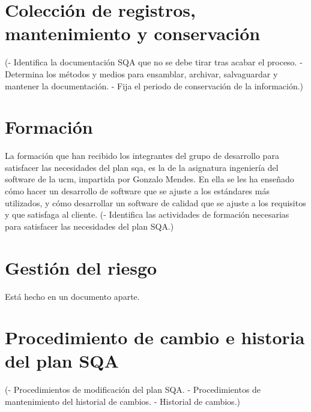 \documentclass[spanish,a4paper,11pt, twoside]{report}	%
\begin{document}
\chapter{ Colección de registros, mantenimiento y conservación}
	(- Identifica la documentación SQA que no se debe
	tirar tras acabar el proceso.
	- Determina los métodos y medios para ensamblar,
	archivar, salvaguardar y mantener la documentación.
	- Fija el periodo de conservación de la información.)

\newpage
\mbox{}
\thispagestyle{empty}						%
\newpage

\chapter{ \hspace{0.25cm}Formación}
	La formación que han recibido los integrantes del grupo de desarrollo para satisfacer las necesidades del plan sqa, es la de la asignatura ingeniería del software de la ucm, impartida por Gonzalo Mendes. En ella se les ha enseñado 
	cómo hacer un desarrollo de software que se ajuste a los estándares más utilizados,  y cómo desarrollar un software de calidad que se ajuste a los requisitos y que satisfaga al cliente.
	(- Identifica las actividades de formación necesarias
	para satisfacer las necesidades del plan SQA.)

\newpage
\mbox{}
\thispagestyle{empty}						%
\newpage

\chapter{ \hspace{0.25cm}Gestión del riesgo}
	Está hecho en un documento aparte.


\newpage
\mbox{}
\thispagestyle{empty}						%
\newpage

\chapter{ Procedimiento de cambio e historia del plan SQA}
	(- Procedimientos de modificación del plan SQA.
	- Procedimientos de mantenimiento del historial de
	cambios.
	- Historial de cambios.)
	


\newpage
\mbox{}
\thispagestyle{empty}						%
\newpage
\end{document}

